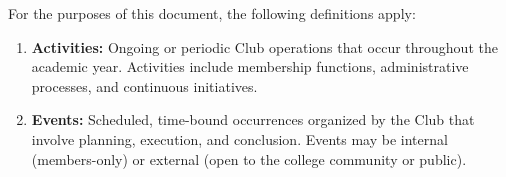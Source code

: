 

For the purposes of this document, the following definitions apply:

\begin{enumerate}[label=\alph*), leftmargin=2em, itemsep=0.3em]
    \item \textbf{Activities:} Ongoing or periodic Club operations that occur throughout the academic year. Activities include membership functions, administrative processes, and continuous initiatives.
    \item \textbf{Events:} Scheduled, time-bound occurrences organized by the Club that involve planning, execution, and conclusion. Events may be internal (members-only) or external (open to the college community or public).
\end{enumerate}


